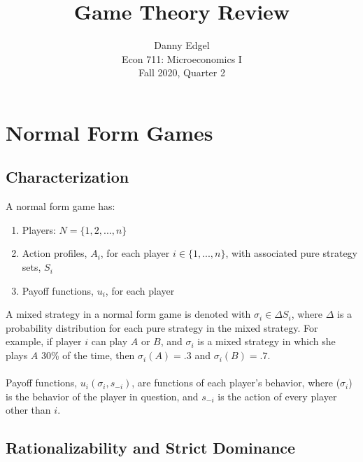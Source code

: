 \documentclass{article}
\begin{document}
\title{	Game Theory Review }
\author{ 	Danny Edgel 					\\ 
			Econ 711: Microeconomics I		\\
			Fall 2020, Quarter 2			\\
		}
\maketitle\thispagestyle{empty}




\section{Normal Form Games}

\subsection{Characterization}
A normal form game has:
\begin{enumerate}
	\item Players: $N = \{1,2,...,n\}$
	\item Action profiles, $A_i$, for each player $i\in\{1,...,n\}$, with associated pure strategy sets, $S_i$
	\item Payoff functions, $u_i$, for each player 
\end{enumerate}
A mixed strategy in a normal form game is denoted with ${\sigma_i\in\Delta S_i}$, where $\Delta$ is a probability distribution for each pure strategy in the mixed strategy. For example, if player $i$ can play $A$ or $B$, and $\sigma_i$ is a mixed strategy in which she plays $A$ 30\% of the time, then ${\sigma_i(A)=.3}$ and ${\sigma_i(B)=.7}$. \\
\\
Payoff functions, $u_i(\sigma_i,s_{-i})$, are functions of each player's behavior, where ($\sigma_i$) is the behavior of the player in question, and $s_{-i}$ is the action of every player other than $i$.


\subsection{Rationalizability and Strict Dominance}
\end{document}
